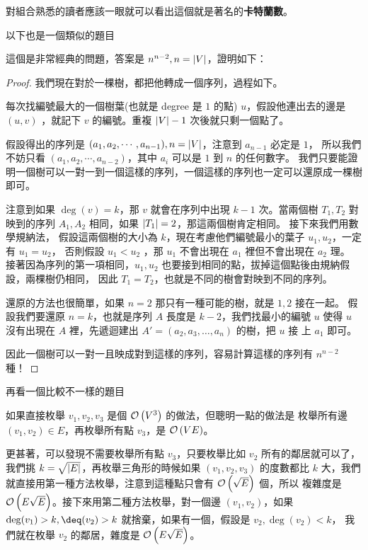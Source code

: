 \documentclass[a4paper,12pt]{book}
\begin{document}
對組合熟悉的讀者應該一眼就可以看出這個就是著名的{\bf 卡特蘭數}。

以下也是一個類似的題目

這個是非常經典的問題，答案是 $n^{n-2}, n = \lvert V \rvert$，證明如下：
\begin{proof}
  我們現在對於一棵樹，都把他轉成一個序列，過程如下。

  每次找編號最大的一個樹葉(也就是 degree 是 $1$ 的點) $u$，假設他連出去的邊是 $(u, v)$
  ，就記下 $v$ 的編號。重複 $\lvert V \rvert-1$ 次後就只剩一個點了。

  假設得出的序列是 $(a_1, a_2, \cdots, a_{n-1}), n = \lvert V \rvert$，注意到 $a_{n-1}$ 必定是 $1$，
  所以我們不妨只看 $(a_1, a_2, \cdots, a_{n-2})$，其中 $a_i$ 可以是 $1$ 到 $n$ 的任何數字。
  我們只要能證明一個樹可以一對一到一個這樣的序列，一個這樣的序列也一定可以還原成一棵樹即可。

  注意到如果 $\deg(v) = k$，那 $v$ 就會在序列中出現 $k-1$ 次。當兩個樹 $T_1, T_2$ 對
  映到的序列 $A_1, A_2$ 相同，如果 $\lvert T_1 \rvert = 2$，那這兩個樹肯定相同。 接下來我們用數學規納法，
  假設這兩個樹的大小為 $k$，現在考慮他們編號最小的葉子 $u_1, u_2$，一定有 $u_1 = u_2$，
  否則假設 $u_1 < u_2$ ，那 $u_1$ 不會出現在 $a_1$ 裡但不會出現在 $a_2$ 理。
  接著因為序列的第一項相同，$u_1, u_2$ 也要接到相同的點，拔掉這個點後由規納假設，兩棵樹仍相同，
  因此 $T_1 = T_2$，也就是不同的樹會對映到不同的序列。

  還原的方法也很簡單，如果 $n = 2$ 那只有一種可能的樹，就是 $1, 2$ 接在一起。
  假設我們要還原 $n = k$，也就是序列 $A$ 長度是 $k - 2$，我們找最小的編號 $u$ 使得
  $u$ 沒有出現在 $A$ 裡，先遞迴建出 $A' = (a_2, a_3, \dots, a_n)$ 的樹，把 $u$ 接
  上 $a_1$ 即可。

  因此一個樹可以一對一且映成對到這樣的序列，容易計算這樣的序列有 $n^{n-2}$ 種！
\end{proof}

再看一個比較不一樣的題目

如果直接枚舉 $v_1, v_2, v_3$ 是個 $\operatorname{\mathcal{O}}\left(V^3\right)$ 的做法，但聰明一點的做法是
枚舉所有邊 $(v_1, v_2) \in E$，再枚舉所有點 $v_3$，是 $\operatorname{\mathcal{O}}\left(VE\right)$。

更甚著，可以發現不需要枚舉所有點 $v_3$，只要枚舉比如 $v_2$ 所有的鄰居就可以了，
我們挑 $k = \sqrt{\lvert E \rvert}$，再枚舉三角形的時候如果 $(v_1, v_2, v_3)$ 的度數都比
$k$ 大，我們就直接用第一種方法枚舉，注意到這種點只會有 $\operatorname{\mathcal{O}}\left(\sqrt{E}\right)$ 個，所以
複雜度是 $\operatorname{\mathcal{O}}\left(E \sqrt{E}\right)$。接下來用第二種方法枚舉，對一個邊 $(v_1, v_2)$，如果
$\deg(v_1) > k, \deq(v_2) > k$ 就捨棄，如果有一個，假設是 $v_2, \deg(v_2) < k$，
我們就在枚舉 $v_2$ 的鄰居，雜度是 $\operatorname{\mathcal{O}}\left(E \sqrt{E}\right)$。
\end{document}
